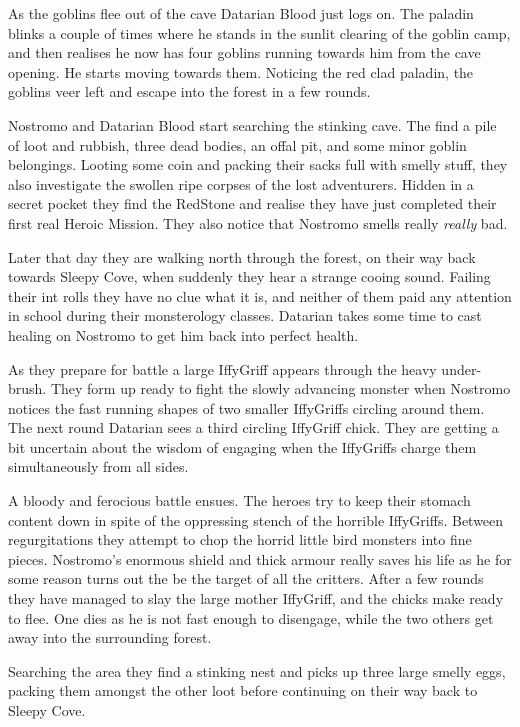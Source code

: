 As the goblins flee out of the cave Datarian Blood just logs on. The paladin blinks a couple of times where he stands in the sunlit clearing of the goblin camp, and then realises he now has four goblins running towards him from the cave opening. He starts moving towards them. Noticing the red clad paladin, the goblins veer left and escape into the forest in a few rounds.

Nostromo and Datarian Blood start searching the stinking cave. The find a pile of loot and rubbish, three dead bodies, an offal pit, and some minor goblin belongings. Looting some coin and packing their sacks full with smelly stuff, they also investigate the swollen ripe corpses of the lost adventurers. Hidden in a secret pocket they find the RedStone and realise they have just completed their first real Heroic Mission. They also notice that Nostromo smells really \emph{really} bad.

Later that day they are walking north through the forest, on their way back towards Sleepy Cove, when suddenly they hear a strange cooing sound. Failing their int rolls they have no clue what it is, and neither of them paid any attention in school during their monsterology classes. Datarian takes some time to cast healing on Nostromo to get him back into perfect health.

As they prepare for battle a large IffyGriff appears through the heavy under-brush. They form up ready to fight the slowly advancing monster when Nostromo notices the fast running shapes of two smaller IffyGriffs circling around them. The next round Datarian sees a third circling IffyGriff chick. They are getting a bit uncertain about the wisdom of engaging when the IffyGriffs charge them simultaneously from all sides.

A bloody and ferocious battle ensues. The heroes try to keep their stomach content down in spite of the oppressing stench of the horrible IffyGriffs. Between regurgitations they attempt to chop the horrid little bird monsters into fine pieces. Nostromo's enormous shield and thick armour really saves his life as he for some reason turns out the be the target of all the critters. After a few rounds they have managed to slay the large mother IffyGriff, and the chicks make ready to flee. One dies as he is not fast enough to disengage, while the two others get away into the surrounding forest.

Searching the area they find a stinking nest and picks up three large smelly eggs, packing them amongst the other loot before continuing on their way back to Sleepy Cove.

